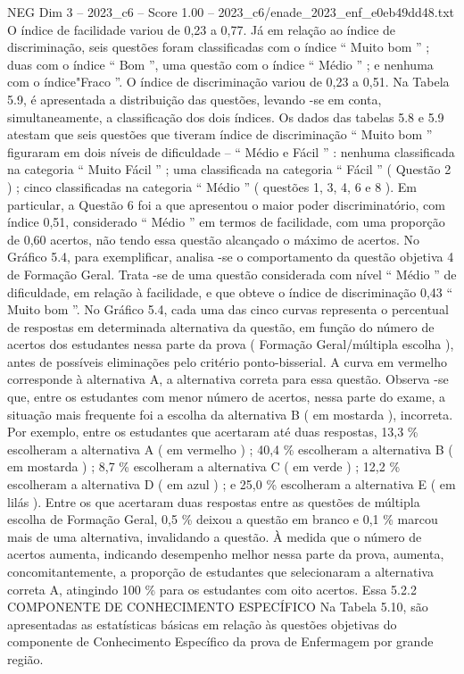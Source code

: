\begin{textsample}{NEG Dim 3 – 2023\_c6 – Score 1.00 – 2023\_c6/enade\_2023\_enf\_e0eb49dd48.txt}
O índice de facilidade variou de 0,23 a 0,77.
Já em relação ao índice de discriminação, seis questões foram classificadas com o índice “ Muito bom ” ; duas com o índice “ Bom ”, uma questão com o índice “ Médio ” ; e nenhuma com o índice"Fraco ”.
O índice de discriminação variou de 0,23 a 0,51.
Na Tabela 5.9, é apresentada a distribuição das questões, levando -se em conta, simultaneamente, a classificação dos dois índices.
Os dados das tabelas 5.8 e 5.9 atestam que seis questões que tiveram índice de discriminação “ Muito bom ” figuraram em dois níveis de dificuldade – “ Médio e Fácil ” : nenhuma classificada na categoria “ Muito Fácil ” ; uma classificada na categoria “ Fácil ” ( Questão 2 ) ; cinco classificadas na categoria “ Médio ” ( questões 1, 3, 4, 6 e 8 ).
Em particular, a Questão 6 foi a que apresentou o maior poder discriminatório, com índice 0,51, considerado “ Médio ” em termos de facilidade, com uma proporção de 0,60 acertos, não tendo essa questão alcançado o máximo de acertos.
No Gráfico 5.4, para exemplificar, analisa -se o comportamento da questão objetiva 4 de Formação Geral.
Trata -se de uma questão considerada com nível “ Médio ” de dificuldade, em relação à facilidade, e que obteve o índice de discriminação 0,43 “ Muito bom ”.
No Gráfico 5.4, cada uma das cinco curvas representa o percentual de respostas em determinada alternativa da questão, em função do número de acertos dos estudantes nessa parte da prova ( Formação Geral/múltipla escolha ), antes de possíveis eliminações pelo critério ponto-bisserial.
A curva em vermelho corresponde à alternativa A, a alternativa correta para essa questão.
Observa -se que, entre os estudantes com menor número de acertos, nessa parte do exame, a situação mais frequente foi a escolha da alternativa B ( em mostarda ), incorreta.
Por exemplo, entre os estudantes que acertaram até duas respostas, 13,3 \% escolheram a alternativa A ( em vermelho ) ; 40,4 \% escolheram a alternativa B ( em mostarda ) ; 8,7 \% escolheram a alternativa C ( em verde ) ; 12,2 \% escolheram a alternativa D ( em azul ) ; e 25,0 \% escolheram a alternativa E ( em lilás ).
Entre os que acertaram duas respostas entre as questões de múltipla escolha de Formação Geral, 0,5 \% deixou a questão em branco e 0,1 \% marcou mais de uma alternativa, invalidando a questão.
À medida que o número de acertos aumenta, indicando desempenho melhor nessa parte da prova, aumenta, concomitantemente, a proporção de estudantes que selecionaram a alternativa correta A, atingindo 100 \% para os estudantes com oito acertos.
Essa 5.2.2 COMPONENTE DE CONHECIMENTO ESPECÍFICO Na Tabela 5.10, são apresentadas as estatísticas básicas em relação às questões objetivas do componente de Conhecimento Específico da prova de Enfermagem por grande região.

\end{textsample}
